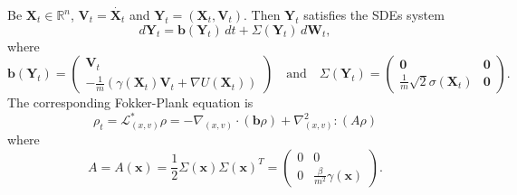 \documentclass[a4paper,11pt]{article}
\theoremstyle{definition}
\theoremstyle{plain}
\theoremstyle{remark}
\begin{document}
Be $\mathbf{X}_t\in\mathbb{R}^n$, $\mathbf{V}_t = \dot{\mathbf{X}_t}$ and $\mathbf{Y}_t = (\mathbf{X}_t,\mathbf{V}_t)$. Then $\mathbf{Y}_t$ satisfies the SDEs system
$$
d\mathbf{Y}_t = \mathbf{b}(\mathbf{Y}_t)\, dt + \Sigma(\mathbf{Y}_t)\,d\mathbf{W}_t,
$$
where
$$
\mathbf{b}(\mathbf{Y}_t) = \left(\begin{matrix}
\mathbf{V}_t \\ -\frac{1}{m}(\gamma(\mathbf{X}_t) \mathbf{V}_t + \nabla U(\mathbf{X}_t))
\end{matrix}\right) \quad \text{and} \quad \Sigma(\mathbf{Y}_t) = \left(\begin{matrix} \mathbf{0} & \mathbf{0} \\ \frac{1}{m}\sqrt{2}\sigma(\mathbf{X}_t) & \mathbf{0} \end{matrix}\right).
$$
The corresponding Fokker-Plank equation is
\begin{equation}
\rho_t = \mathcal{L}^*_{(x,v)} \rho = -\nabla_{(x,v)} \cdot (\mathbf{b}\rho) + \nabla^2_{(x,v)}:(A\rho)\label{ex4:nd_fp}
\end{equation}
where
$$
A = A(\mathbf{x}) = \frac{1}{2}\Sigma(\mathbf{x})\Sigma(\mathbf{x})^T = \left(\begin{matrix}
0 & 0 \\ 0 & \frac{\beta}{m^2}\gamma(\mathbf{x})
\end{matrix}\right).
$$
\end{document}
